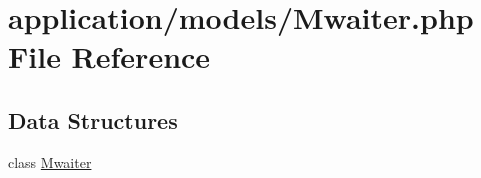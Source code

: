 \hypertarget{_mwaiter_8php}{}\section{application/models/\+Mwaiter.php File Reference}
\label{_mwaiter_8php}
\subsection*{Data Structures}
\begin{DoxyCompactItemize}
\item 
class \mbox{\hyperlink{class_mwaiter}{Mwaiter}}
\end{DoxyCompactItemize}

